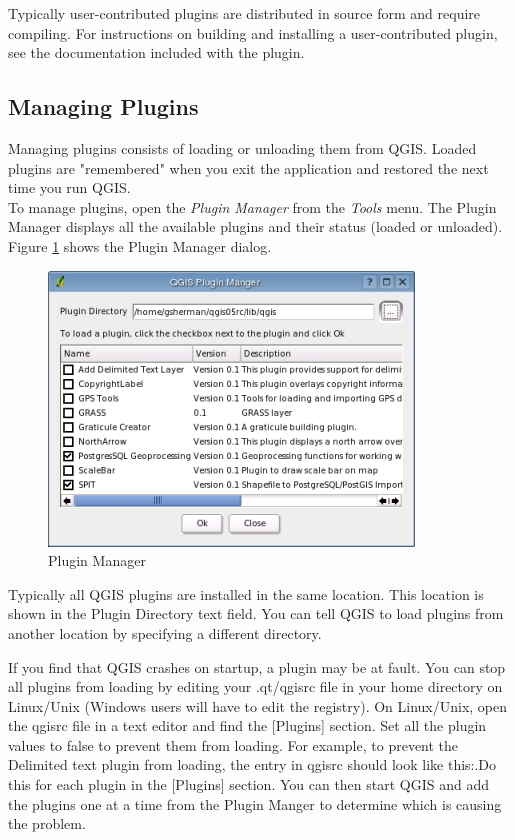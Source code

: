 \documentclass[10pt,english]{article}
\newcommand\qgistip[1]{\raggedright\small{#1}}
\begin{document}
\begin{onehalfspace}
Typically user-contributed plugins are distributed in source form and require compiling. For instructions on building and installing a user-contributed plugin, see the documentation included with the plugin.
\subsection{Managing Plugins}\label{sec:managing_plugins}
Managing plugins consists of loading or unloading them from QGIS. Loaded plugins are "remembered" when you exit the application and restored the next time you run QGIS.\\

To manage plugins, open the \textsl{Plugin Manager} from the \textsl{Tools}
menu. The Plugin Manager displays all the available plugins and their status (loaded or unloaded). Figure \ref{fig:pluginmanager} shows the Plugin Manager dialog.

\begin{figure}[h]
   \begin{center}
   \caption{Plugin Manager}\label{fig:pluginmanager}\smallskip
   \includegraphics{qgis_user_guide_images/pluginmanager_80pct}
\end{center}  
\end{figure}
Typically all QGIS plugins are installed in the same location. This location is shown in the Plugin Directory text field. You can tell QGIS to load plugins from another location by specifying a different directory.
\begin{Tip}\caption{\textsc{Crashing Plugins}}
\qgistip{If you find that QGIS crashes on startup, a plugin may be at fault. You can stop all plugins from loading by editing your .qt/qgisrc file in your home directory on Linux/Unix (Windows users will have to edit the registry). On Linux/Unix, open the qgisrc file in a text editor and find the [Plugins] section. Set all the plugin values to false to prevent them from loading. For example, to prevent the Delimited text plugin from loading, the entry in qgisrc should look like this:\ttfamily{
 Add Delimited Text Layer=false}.\normalfont  Do this for each plugin in the [Plugins] section. You can then start QGIS and add the plugins one at a time from the Plugin Manger to determine which is causing the problem.

}
\end{Tip}
\end{onehalfspace}
\end{document}
